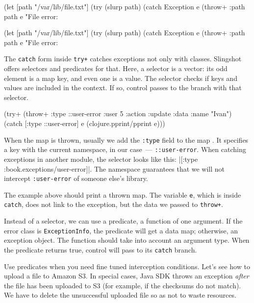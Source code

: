 \begin{clojure}
(let [path "/var/lib/file.txt"]
  (try
    (slurp path)
    (catch Exception e
      (throw+ {:path path} e
      "File error: %
\end{clojure}

\else

\begin{clojure}
(let [path "/var/lib/file.txt"]
  (try
    (slurp path)
    (catch Exception e
      (throw+ {:path path} e "File error: %
\end{clojure}

\fi


The \verb|catch| form inside \verb|try+| catches exceptions not only with classes. Slingshot offers selectors and predicates for that. Here, a selector is a vector: its odd element is a map key, and even one is a value. The selector checks if keys and values are included in the context. If so, control passes to the branch with that selector.

\begin{clojure/lines}
(try+
 (throw+ {:type ::user-error
          :user 5
          :action :update
          :data {:name "Ivan"}})
 (catch [:type ::user-error] e
   (clojure.pprint/pprint e)))
\end{clojure/lines}

When the map is thrown, usually we add the \verb|:type| field to the map . It specifies a key with the current namespace, in our case~--- \verb|::user-error|. When catching exceptions in another module, the selector looks like this: \spverb|[:type :book.exceptions/user-error]|. The namespace guarantees that we will not intercept \texttt{:user\--error} of someone else's library.

The example above should print a thrown map. The variable \verb|e|, which is inside \verb|catch|, does not link to the exception, but the data we passed to \verb|throw+|.

Instead of a selector, we can use a predicate, a function of one argument. If the error class is \verb|ExceptionInfo|, the predicate will get a data map; otherwise, an exception object. The function should take into account an argument type. When the predicate returns true, control will pass to its \verb|catch| branch.


Use predicates when you need fine tuned interception conditions. Let's see how to upload a file to Amazon S3. In special cases, Java SDK throws an exception \emph{after} the file has been uploaded to S3 (for example, if the checksums do not match). We have to delete the unsuccessful uploaded file so as not to waste resources.

